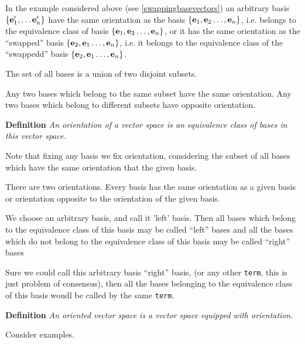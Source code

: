 \documentclass[12pt]{article}
\numberwithin{equation}{section}
\begin{document}
In the example considered above (see 
\eqref{swappingbasevectors})
 an arbitrary basis $\{{\bf e}'_1,\dots{\bf e}'_n\}$
have the same orientation as the basis  $\{{\bf e}_1,{\bf e}_2\dots,{\bf e}_n\}$, i.e. belongs to the equivalence
class of basis $\{{\bf e}_1,{\bf e}_2\dots,{\bf e}_n\}$, or it has the same orientation as the ``swapped''
 basis  $\{{\bf e}_2,{\bf e}_1\dots,{\bf e}_n\}$, i.e. it belongs to the equivalence
class of the ``swappedd'' basis $\{{\bf e}_2,{\bf e}_1\dots,{\bf e}_n\}$.

\m


  The set of all bases is a union of two disjoint subsets.

  Any two bases which belong to the same subset  have the same orientation.
 Any two bases which belong to different subsets  have opposite orientation.

{\bf Definition} {\it An orientation of a vector  space is an equivalence class of bases in this vector space.}

    Note that fixing any basis we fix orientation, considering the subset of all bases
    which have the same orientation that the given basis.

   There are two orientations. Every basis has the same orientation as a given basis
or orientation opposite to the orientation of the given basis.

   We choose  an arbitrary basis,
and call it 'left' basis.  
Then all bases which belong to the equivalence class of 
this basis may be called
``left'' bases
 and all the bases which do not belong to the 
equivalence class of
this basis may be called ``right'' bases

  Sure we could call this arbitrary basis ``right'' basis,
   (or any other {\tt term}, this is just problem of consensus),
then all the bases belonging
 to the equivalence class of  this basis woudl be
called by the same {\tt term}. 

\medskip

  {\bf Definition} {\it An oriented vector space is a vector space equipped with orientation.}




\m

Consider examples.

\m

\end{document}

